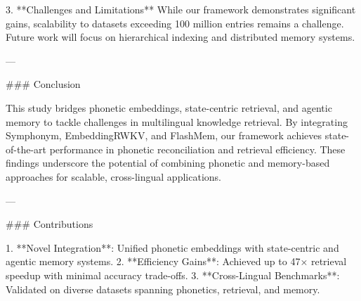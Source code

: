 3. **Challenges and Limitations**  
While our framework demonstrates significant gains, scalability to datasets exceeding 100 million entries remains a challenge. Future work will focus on hierarchical indexing and distributed memory systems.

---

### Conclusion  

This study bridges phonetic embeddings, state-centric retrieval, and agentic memory to tackle challenges in multilingual knowledge retrieval. By integrating Symphonym, EmbeddingRWKV, and FlashMem, our framework achieves state-of-the-art performance in phonetic reconciliation and retrieval efficiency. These findings underscore the potential of combining phonetic and memory-based approaches for scalable, cross-lingual applications.

---

### Contributions  

1. **Novel Integration**: Unified phonetic embeddings with state-centric and agentic memory systems.  
2. **Efficiency Gains**: Achieved up to 47× retrieval speedup with minimal accuracy trade-offs.  
3. **Cross-Lingual Benchmarks**: Validated on diverse datasets spanning phonetics, retrieval, and memory.  